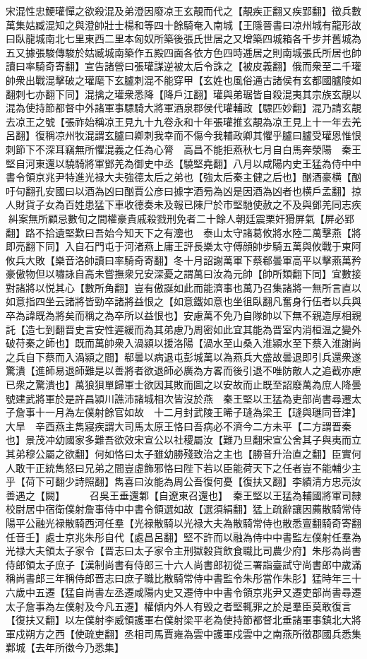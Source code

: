 宋混性忠鯁瓘憚之欲殺混及弟澄因廢凉王玄靚而代之【靚疾正翻又疾郢翻】徵兵數萬集姑臧混知之與澄帥壯士楊和等四十餘騎奄入南城【王隱晉書曰凉州城有龍形故曰臥龍城南北七里東西二里本匈奴所築後張氏世居之又增築四城箱各千步并舊城為五又據張駿傳駿於姑臧城南築作五殿四面各依方色四時逓居之則南城張氏所居也帥讀曰率騎奇寄翻】宣告諸營曰張瓘謀逆被太后令誅之【被皮義翻】俄而衆至二千瓘帥衆出戰混擊破之瓘麾下玄臚刺混不能穿甲【玄姓也風俗通古諸侯有玄都國臚陵如翻刺七亦翻下同】混擒之瓘衆悉降【降戶江翻】瓘與弟琚皆自殺混夷其宗族玄靚以混為使持節都督中外諸軍事驃騎大將軍酒泉郡侯代瓘輔政【驃匹妙翻】混乃請玄靚去凉王之號【張祚始稱凉王見九十九卷永和十年張瓘推玄靚為凉王見上十一年去羌呂翻】復稱凉州牧混謂玄臚曰卿刺我幸而不傷今我輔政卿其懼乎臚曰臚受瓘恩惟恨刺節下不深耳竊無所懼混義之任為心膂　高昌不能拒燕秋七月自白馬奔滎陽　秦王堅自河東還以驍騎將軍鄧羌為御史中丞【驍堅堯翻】八月以咸陽内史王猛為侍中中書令領京兆尹特進光禄大夫強德太后之弟也【強太后秦主健之后也】酗酒豪横【酗吁句翻孔安國曰以酒為凶曰酗賈公彦曰據字酒㫄為凶是因酒為凶者也横戶孟翻】掠人財貨子女為百姓患猛下車收德奏未及報已陳尸於市堅馳使赦之不及與鄧羌同志疾糾案無所顧忌數旬之間權豪貴戚殺戮刑免者二十餘人朝廷震栗奸猾屏氣【屏必郢翻】路不拾遺堅歎曰吾始今知天下之有灋也　泰山太守諸葛攸將水陸二萬擊燕【將即亮翻下同】入自石門屯于河渚燕上庸王評長樂太守傅顔帥步騎五萬與攸戰于東阿攸兵大敗【樂音洛帥讀曰率騎奇寄翻】冬十月詔謝萬軍下蔡郗曇軍高平以擊燕萬矜豪傲物但以嘯詠自高未嘗撫衆兄安深憂之謂萬曰汝為元帥【帥所類翻下同】宜數接對諸將以悦其心【數所角翻】豈有傲誕如此而能濟事也萬乃召集諸將一無所言直以如意指四坐云諸將皆勁卒諸將益恨之【如意鐵如意也坐徂臥翻凡奮身行伍者以兵與卒為諱既為將矣而稱之為卒所以益恨也】安慮萬不免乃自隊帥以下無不親造厚相親託【造七到翻晋史言安性遲緩而為其弟慮乃周密如此宜其能為晋室内消桓温之變外破苻秦之師也】既而萬帥衆入渦潁以援洛陽【渦水至山桑入淮潁水至下蔡入淮謝尚之兵自下蔡而入渦潁之間】郗曇以病退屯彭城萬以為燕兵大盛故曇退即引兵還衆遂驚潰【進師易退師難是以善將者欲退師必廣為方畧而後引退不唯防敵人之追截亦慮已衆之驚潰也】萬狼狽單歸軍士欲因其敗而圖之以安故而止既至詔廢萬為庶人降曇號建武將軍於是許昌潁川譙沛諸城相次皆沒於燕　秦王堅以王猛為吏部尚書尋遷太子詹事十一月為左僕射餘官如故　十二月封武陵王晞子㻱為梁王【㻱與璡同音津】　大旱　辛酉燕主雋寢疾謂大司馬太原王恪曰吾病必不濟今二方未平【二方謂晋秦也】景茂冲幼國家多難吾欲效宋宣公以社稷屬汝【難乃旦翻宋宣公舍其子與夷而立其弟穆公屬之欲翻】何如恪曰太子雖幼勝殘致治之主也【勝音升治直之翻】臣實何人敢干正統雋怒曰兄弟之間豈虛飾邪恪曰陛下若以臣能荷天下之任者豈不能輔少主乎【荷下可翻少詩照翻】雋喜曰汝能為周公吾復何憂【復扶又翻】李績清方忠亮汝善遇之【闕】　　　召吳王垂還鄴【自遼東召還也】　秦王堅以王猛為輔國將軍司隸校尉居中宿衛僕射詹事侍中中書令領選如故【選須絹翻】猛上疏辭讓因薦散騎常侍陽平公融光禄散騎西河任羣【光禄散騎以光禄大夫為散騎常侍也散悉亶翻騎奇寄翻任音壬】處士京兆朱彤自代【處昌呂翻】堅不許而以融為侍中中書監左僕射任羣為光禄大夫領太子家令【晋志曰太子家令主刑獄穀貨飲食職比司農少府】朱彤為尚書侍郎領太子庶子【漢制尚書有侍郎三十六人尚書郎初從三署詣臺試守尚書郎中歲滿稱尚書郎三年稱侍郎晋志曰庶子職比散騎常侍中書監令朱彤當作朱肜】猛時年三十六歲中五遷【猛自尚書左丞遷咸陽内史又遷侍中中書令領京兆尹又遷吏部尚書尋遷太子詹事為左僕射及今凡五遷】權傾内外人有毁之者堅輒罪之於是羣臣莫敢復言【復扶又翻】以左僕射李威領護軍右僕射梁平老為使持節都督北垂諸軍事鎮北大將軍戍朔方之西【使疏吏翻】丞相司馬賈雍為雲中護軍戍雲中之南燕所徵郡國兵悉集鄴城【去年所徵今乃悉集】

